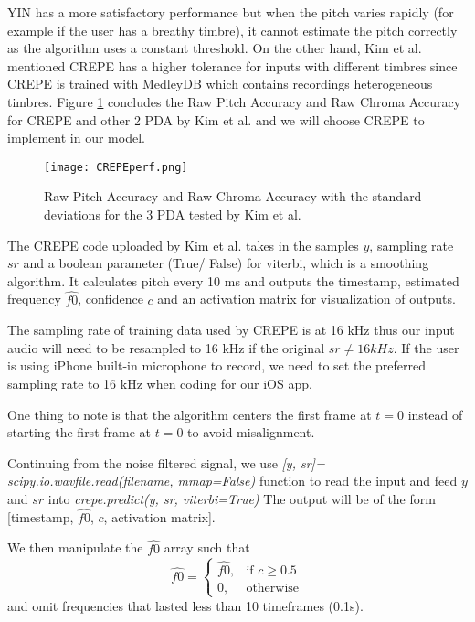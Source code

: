YIN has a more satisfactory performance but when the pitch varies rapidly (for example if the user has a breathy timbre), it cannot 
estimate the pitch correctly as the algorithm uses a constant threshold. On the other hand, Kim et al. mentioned CREPE has a higher 
tolerance for inputs with different timbres since CREPE is trained with MedleyDB which contains recordings heterogeneous timbres. Figure 
\ref{CREPEperf} concludes the Raw Pitch Accuracy and Raw Chroma Accuracy for CREPE and other 2 PDA by Kim et al. and we will choose CREPE 
to implement in our model.

\begin{figure}
	\texttt{[image: CREPEperf.png]}
	\caption{Raw Pitch Accuracy and Raw Chroma Accuracy with the standard deviations for the 3 PDA tested by Kim et al. \cite{CREPE}}
	\label{CREPEperf}
\end{figure}

The CREPE code uploaded by Kim et al. takes in the samples $y$, sampling rate $sr$ and a boolean parameter (True/ False) for viterbi, which is a smoothing algorithm. 
It calculates pitch every 10 ms and outputs the timestamp, estimated frequency $\hat{f0}$, confidence $c$ and an activation matrix for visualization of outputs. 

The sampling rate of training data used by CREPE is at 16 kHz thus our input audio will need to be resampled to 16 kHz if the original $sr \neq 16 kHz$. If the user is using iPhone 
built-in microphone to record, we need to set the preferred sampling rate to 16 kHz \cite{iphoneaud} when coding for our iOS app.

One thing to note is that the algorithm centers the first frame at $t=0$ instead of starting the first frame at $t=0$ to avoid misalignment.

Continuing from the noise filtered signal, we use \emph{[y, sr]= scipy.io.wavfile.read(filename, mmap=False)} function to read the input and feed $y$ and $sr$ into \emph{crepe.predict(y, sr, viterbi=True)}
The output will be of the form [timestamp, $\hat{f0}$, $c$, activation matrix].

We then manipulate the $\hat{f0}$ array such that
\[\hat{f0}= 
\begin{cases}
    \hat{f0},		& \text{if } c\geq 0.5\\
    0,              & \text{otherwise}
\end{cases}
\]
and omit frequencies that lasted less than 10 timeframes (0.1s).
